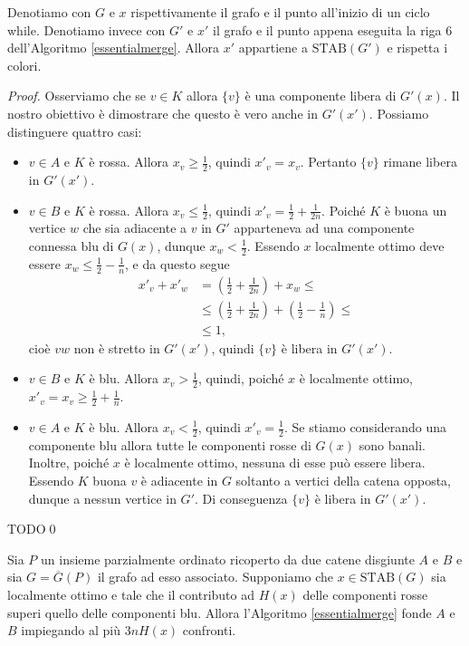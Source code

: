 \begin{lemma}
	\label{evolutionlemma} Denotiamo con \(G\) e \(x\) rispettivamente il grafo e il punto all'inizio di un ciclo while. Denotiamo invece con \(G'\) e \(x'\) il grafo e il punto appena eseguita la riga \(6\) dell'Algoritmo \ref{essentialmerge}. Allora \(x'\) appartiene a \(\text{STAB}(G')\) e rispetta i colori. 
\end{lemma}
\begin{proof}
	Osserviamo che se \(v\in K\) allora \(\{v\}\) \`e una componente libera di \(G'(x)\). Il nostro obiettivo \`e dimostrare che questo \`e vero anche in \(G'(x')\). Possiamo distinguere quattro casi: 
	\begin{itemize}
		\item \(v\in A\) e \(K\) \`e rossa. Allora \(x_v\ge\frac{1}{2}\), quindi \(x'_v=x_v\). Pertanto \(\{v\}\) rimane libera in \(G'(x')\). 
		\item \(v\in B\) e \(K\) \`e rossa. Allora \(x_v\le\frac{1}{2}\), quindi \(x'_v=\frac{1}{2}+\frac{1}{2n}\). Poich\'e \(K\) \`e buona un vertice \(w\) che sia adiacente a \(v\) in \(G'\) apparteneva ad una componente connessa blu di \(G(x)\), dunque \(x_w<\frac{1}{2}\). Essendo \(x\) localmente ottimo deve essere \(x_w\le\frac{1}{2}-\frac{1}{n}\), e da questo segue 
		\begin{align}
			x'_v+x'_w &= (\frac{1}{2} + \frac{1}{2n}) + x_w \le \nonumber \\
			&\le (\frac{1}{2} + \frac{1}{2n}) + (\frac{1}{2} - \frac{1}{n}) \le \nonumber \\
			&\le 1\text{,} \nonumber 
		\end{align}
		cio\`e \(vw\) non \`e stretto in \(G'(x')\), quindi \(\{v\}\) \`e libera in \(G'(x')\). 
		\item \(v\in B\) e \(K\) \`e blu. Allora \(x_v>\frac{1}{2}\), quindi, poich\'e \(x\) \`e localmente ottimo, \(x'_v=x_v\ge\frac{1}{2}+\frac{1}{n}\). 
		\item \(v\in A\) e \(K\) \`e blu. Allora \(x_v<\frac{1}{2}\), quindi \(x'_v=\frac{1}{2}\). Se stiamo considerando una componente blu allora tutte le componenti rosse di \(G(x)\) sono banali. Inoltre, poich\'e \(x\) \`e localmente ottimo, nessuna di esse pu\`o essere libera. Essendo \(K\) buona \(v\) \`e adiacente in \(G\) soltanto a vertici della catena opposta, dunque a nessun vertice in \(G'\). Di conseguenza \(\{v\}\) \`e libera in \(G'(x')\). 
	\end{itemize}
	TODO\qed 
\end{proof}
\begin{lemma}
	\label{finallemma} Sia \(P\) un insieme parzialmente ordinato ricoperto da due catene disgiunte \(A\) e \(B\) e sia \(G=\overline{G}(P)\) il grafo ad esso associato. Supponiamo che \(x\in\text{STAB}(G)\) sia localmente ottimo e tale che il contributo ad \(H(x)\) delle componenti rosse superi quello delle componenti blu. Allora l'Algoritmo \ref{essentialmerge} fonde \(A\) e \(B\) impiegando al pi\`u \(3nH(x)\) confronti. 
\end{lemma}

